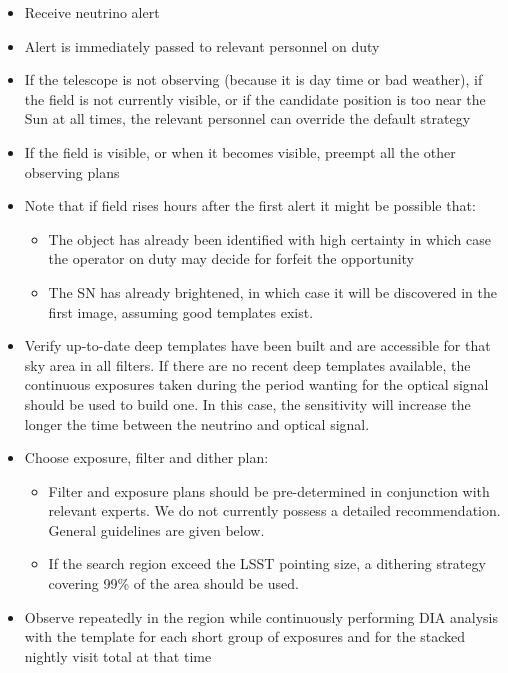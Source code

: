 \documentclass[12pt, letterpaper]{article}
\begin{document}
\begin{itemize}
\item Receive neutrino alert
\item Alert is immediately passed to relevant personnel on duty
\item If the telescope is not observing (because it is day time or bad
  weather), if the field is not currently visible, or if the candidate position is too near the Sun at all times, the relevant
  personnel can override the default strategy
\item If the field is visible, or when it becomes visible, preempt all
  the other observing plans
\item Note that if field rises hours after the first alert it might be possible that:
  \begin{itemize}
  \item The object has already been identified with high certainty in
    which case the operator on duty may decide for forfeit the
    opportunity
  \item The SN has already brightened, in which case it will be
    discovered in the first image, assuming good templates exist.
\end{itemize}

\item Verify up-to-date deep templates have been built and are accessible for that sky area in all filters.  If there are no recent deep templates available, the continuous exposures taken during the period wanting for the optical signal should be used to build one.  In this case, the sensitivity will increase the longer the time between the neutrino and optical signal.

\item Choose exposure, filter and dither plan:
\begin{itemize}
\item Filter and exposure plans should be pre-determined in
  conjunction with relevant experts. We do not currently possess a
  detailed recommendation. General guidelines are given below.
\item If the search region exceed the LSST pointing size, a dithering
  strategy covering 99\% of the area should be used.
\end{itemize}

\item Observe repeatedly in the region while continuously performing DIA analysis with the template for each short group of exposures and for the stacked nightly visit total at that time


\end{itemize}
\end{document}

